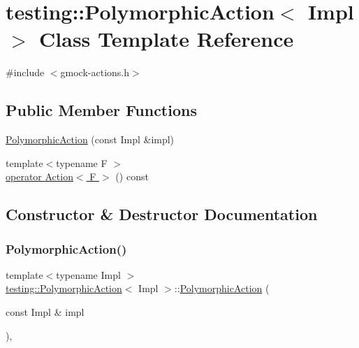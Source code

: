 \hypertarget{classtesting_1_1_polymorphic_action}{}\section{testing\+:\+:Polymorphic\+Action$<$ Impl $>$ Class Template Reference}
\label{classtesting_1_1_polymorphic_action}


{\ttfamily \#include $<$gmock-\/actions.\+h$>$}

\subsection*{Public Member Functions}
\begin{DoxyCompactItemize}
\item 
\hyperlink{classtesting_1_1_polymorphic_action_a062e5a45ad61dcf8085b15cc882ca0ae}{Polymorphic\+Action} (const Impl \&impl)
\item 
{\footnotesize template$<$typename F $>$ }\\\hyperlink{classtesting_1_1_polymorphic_action_ac35461616cc15c06f1a2f9ee1c03fb8f}{operator Action$<$ F $>$} () const
\end{DoxyCompactItemize}


\subsection{Constructor \& Destructor Documentation}
\mbox{\label{classtesting_1_1_polymorphic_action_a062e5a45ad61dcf8085b15cc882ca0ae}} 
\subsubsection{\texorpdfstring{Polymorphic\+Action()}{PolymorphicAction()}}
{\footnotesize\ttfamily template$<$typename Impl $>$ \\
\hyperlink{classtesting_1_1_polymorphic_action}{testing\+::\+Polymorphic\+Action}$<$ Impl $>$\+::\hyperlink{classtesting_1_1_polymorphic_action}{Polymorphic\+Action} (\begin{DoxyParamCaption}\item[{const Impl \&}]{impl }\end{DoxyParamCaption})\hspace{0.3cm}{\ttfamily [inline]}, {\ttfamily [explicit]}}



